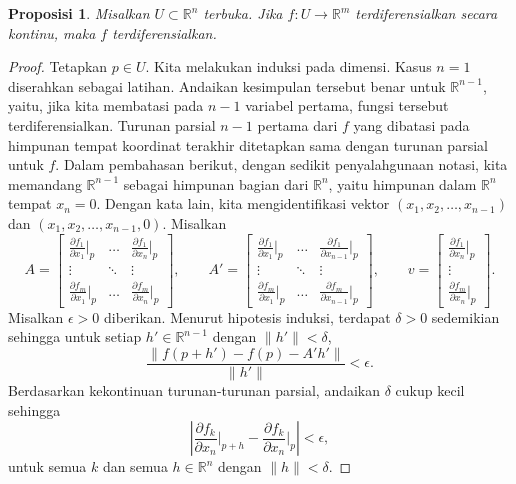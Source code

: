 \documentclass[12pt,openany]{book}
\newcommand{\snorm}[1]{\lVert {#1} \rVert}
\newcommand{\abs}[1]{\left\lvert {#1} \right\rvert}
\newcommand{\R}{{\mathbb{R}}}
\theoremstyle{plain}
\newtheorem{prop}[thm]{Proposisi}
\theoremstyle{remark}
\theoremstyle{definition}
\theoremstyle{exercise}
\theoremstyle{example}
\begin{document}
\begin{prop} \label{mv:prop:contdiffpartials}
Misalkan $U \subset \R^n$ terbuka.
Jika $f \colon U \to \R^m$
terdiferensialkan secara kontinu, maka
$f$ terdiferensialkan.
\end{prop}

\begin{proof}
Tetapkan $p \in U$.  Kita melakukan induksi pada dimensi.  Kasus $n=1$ diserahkan
sebagai latihan.
Andaikan kesimpulan tersebut benar untuk $\R^{n-1}$,
yaitu,
jika kita membatasi pada $n-1$ variabel pertama, fungsi tersebut terdiferensialkan.
Turunan parsial $n-1$ pertama dari $f$ yang dibatasi pada himpunan tempat koordinat terakhir
ditetapkan sama dengan turunan parsial untuk $f$.
Dalam pembahasan berikut, dengan sedikit penyalahgunaan notasi,
kita memandang $\R^{n-1}$ sebagai himpunan bagian dari $\R^n$, yaitu himpunan dalam $\R^n$ tempat $x_n = 0$.
Dengan kata lain, kita mengidentifikasi vektor $(x_1,x_2,\ldots,x_{n-1})$ dan
$(x_1,x_2,\ldots,x_{n-1},0)$.
Misalkan
\begin{equation*}
A = 
\begin{bmatrix}
\frac{\partial f_1}{\partial x_1}\big|_p
& \ldots &
\frac{\partial f_1}{\partial x_n}\big|_p
\\
\vdots & \ddots & \vdots
\\
\frac{\partial f_m}{\partial x_1}\big|_p
& \ldots &
\frac{\partial f_m}{\partial x_n}\big|_p
\end{bmatrix} ,
\qquad
A' = 
\begin{bmatrix}
\frac{\partial f_1}{\partial x_1}\big|_p
& \ldots &
\frac{\partial f_1}{\partial x_{n-1}}\big|_p
\\
\vdots & \ddots & \vdots
\\
\frac{\partial f_m}{\partial x_1}\big|_p
& \ldots &
\frac{\partial f_m}{\partial x_{n-1}}\big|_p
\end{bmatrix} ,
\qquad
v = 
\begin{bmatrix}
\frac{\partial f_1}{\partial x_n}\big|_p
\\
\vdots
\\
\frac{\partial f_m}{\partial x_n}\big|_p
\end{bmatrix} .
\end{equation*}
Misalkan $\epsilon > 0$ diberikan.  Menurut hipotesis induksi, terdapat
$\delta > 0$ sedemikian sehingga
untuk setiap $h' \in \R^{n-1}$ dengan $\snorm{h'} < \delta$,
\begin{equation*}
\frac{\snorm{f(p+h') - f(p) - A' h'}}{\snorm{h'}} < \epsilon .
\end{equation*}
Berdasarkan kekontinuan turunan-turunan parsial, andaikan $\delta$ cukup
kecil sehingga
\begin{equation*}
\abs{\frac{\partial f_k}{\partial x_n}\Big|_{p+h}
      - \frac{\partial f_k}{\partial x_n}\Big|_{p}} < \epsilon ,
\end{equation*}
untuk semua $k$ dan semua $h \in \R^n$ dengan $\snorm{h} < \delta$.


\end{proof}
\end{document}
